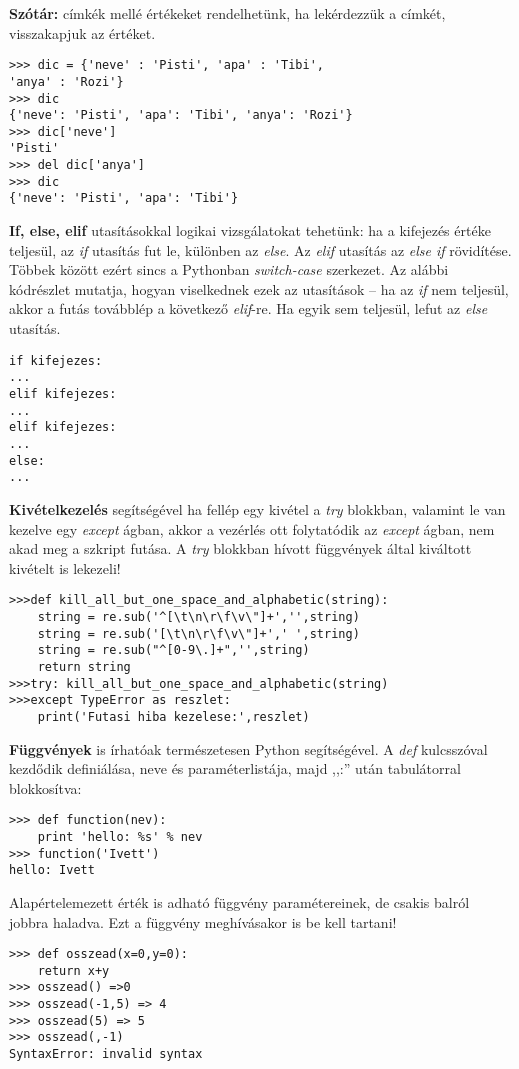 \documentclass[a4paper,oneside,12pt]{article}
\begin{document}
\textbf{Szótár:} címkék mellé értékeket rendelhetünk, ha lekérdezzük a címkét, visszakapjuk az értéket.
\begin{lstlisting}
>>> dic = {'neve' : 'Pisti', 'apa' : 'Tibi',
'anya' : 'Rozi'}
>>> dic
{'neve': 'Pisti', 'apa': 'Tibi', 'anya': 'Rozi'}
>>> dic['neve']
'Pisti'
>>> del dic['anya']
>>> dic
{'neve': 'Pisti', 'apa': 'Tibi'}
\end{lstlisting}

\textbf{If, else, elif} utasításokkal logikai vizsgálatokat tehetünk: ha a kifejezés értéke teljesül, az \emph{if} utasítás fut le, különben az \emph{else}. Az \emph{elif} utasítás az \emph{else if} rövidítése. Többek között ezért sincs a Pythonban \emph{switch-case} szerkezet. Az alábbi kódrészlet mutatja, hogyan viselkednek ezek az utasítások -- ha az \emph{if} nem teljesül, akkor a futás továbblép a következő \emph{elif}-re. Ha egyik sem teljesül, lefut az \emph{else} utasítás.
\begin{lstlisting}
if kifejezes:
...
elif kifejezes:
...
elif kifejezes:
...
else:
...
\end{lstlisting}

\textbf{Kivételkezelés} segítségével ha fellép egy kivétel a \emph{try} blokkban, valamint le van kezelve egy \emph{except} ágban, akkor a vezérlés ott folytatódik az \emph{except} ágban, nem akad meg a szkript futása. A \emph{try} blokkban hívott függvények által kiváltott kivételt is lekezeli!
\begin{lstlisting}
>>>def kill_all_but_one_space_and_alphabetic(string):
	string = re.sub('^[\t\n\r\f\v\"]+','',string)
	string = re.sub('[\t\n\r\f\v\"]+',' ',string)
	string = re.sub("^[0-9\.]+",'',string)
	return string
>>>try: kill_all_but_one_space_and_alphabetic(string)
>>>except TypeError as reszlet:
	print('Futasi hiba kezelese:',reszlet)
\end{lstlisting}

\textbf{Függvények} is írhatóak természetesen Python segítségével. A \emph{def} kulcsszóval kezdődik definiálása, neve és paraméterlistája, majd ,,:'' után tabulátorral blokkosítva:
\begin{lstlisting}
>>> def function(nev):
	print 'hello: %s' % nev
>>> function('Ivett')
hello: Ivett
\end{lstlisting}
Alapértelemezett érték is adható függvény paramétereinek, de csakis balról jobbra haladva. Ezt a függvény meghívásakor is be kell tartani!
\begin{lstlisting}
>>> def osszead(x=0,y=0):
	return x+y
>>> osszead() =>0
>>> osszead(-1,5) => 4
>>> osszead(5) => 5
>>> osszead(,-1)
SyntaxError: invalid syntax
\end{lstlisting}
\end{document}
